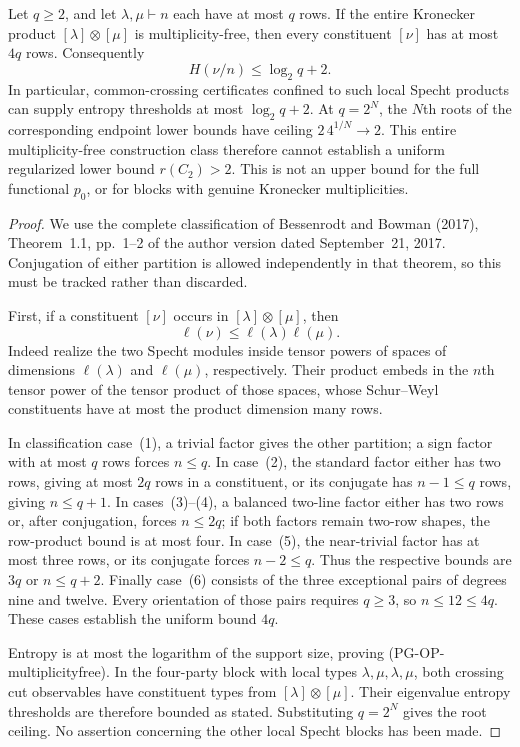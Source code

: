 \begin{proposition}
\label{pg:op-multiplicityfree}
Let $q\geq2$, and let $\lambda,\mu\vdash n$ each have at most $q$ rows.
If the entire Kronecker product $[\lambda]\otimes[\mu]$ is
multiplicity-free, then every constituent $[\nu]$ has at most $4q$ rows.
Consequently
\[
 H(\nu/n)\leq\log_2q+2.
 \tag{PG-OP-multiplicityfree}
\]
In particular, common-crossing certificates confined to such local Specht
products can supply entropy thresholds at most $\log_2q+2$. At
$q=2^N$, the $N$th roots of the corresponding endpoint lower bounds have
ceiling $2\,4^{1/N}\to2$. This entire multiplicity-free construction class
therefore cannot establish a uniform regularized lower bound
$r(C_2)>2$. This is not an upper bound for the full functional $p_0$, or
for blocks with genuine Kronecker multiplicities.
\end{proposition}
\begin{proof}
We use the complete classification of Bessenrodt and Bowman (2017),
Theorem~1.1, pp.~1--2 of the author version dated September~21, 2017.
Conjugation of either partition is allowed independently in that theorem,
so this must be tracked rather than discarded.

First, if a constituent $[\nu]$ occurs in
$[\lambda]\otimes[\mu]$, then
\[
 \ell(\nu)\leq\ell(\lambda)\ell(\mu).
\]
Indeed realize the two Specht modules inside tensor powers of spaces of
dimensions $\ell(\lambda)$ and $\ell(\mu)$, respectively. Their product
embeds in the $n$th tensor power of the tensor product of those spaces,
whose Schur--Weyl constituents have at most the product dimension many
rows.

In classification case~(1), a trivial factor gives the other partition;
a sign factor with at most $q$ rows forces $n\leq q$. In case~(2), the
standard factor either has two rows, giving at most $2q$ rows in a
constituent, or its conjugate has $n-1\leq q$ rows, giving
$n\leq q+1$. In cases~(3)--(4), a balanced two-line factor either has
two rows or, after conjugation, forces $n\leq2q$; if both factors remain
two-row shapes, the row-product bound is at most four. In case~(5), the
near-trivial factor has at most three rows, or its conjugate forces
$n-2\leq q$. Thus the respective bounds are $3q$ or $n\leq q+2$.
Finally case~(6) consists of the three exceptional pairs of degrees nine
and twelve. Every orientation of those pairs requires $q\geq3$, so
$n\leq12\leq4q$. These cases establish the uniform bound $4q$.

Entropy is at most the logarithm of the support size, proving
(PG-OP-multiplicityfree). In the four-party block with local types
$\lambda,\mu,\lambda,\mu$, both crossing cut observables have constituent
types from $[\lambda]\otimes[\mu]$. Their eigenvalue entropy thresholds
are therefore bounded as stated. Substituting $q=2^N$ gives the root
ceiling. No assertion concerning the other local Specht blocks has been
made.
\end{proof}


